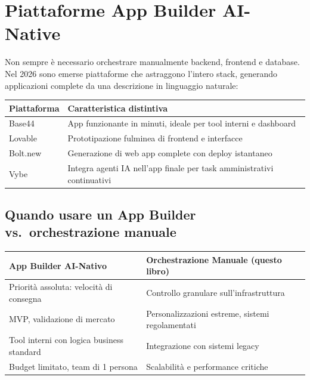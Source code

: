 \section{Piattaforme App Builder AI-Native}

Non sempre è necessario orchestrare manualmente backend, frontend e database. Nel 2026 sono emerse piattaforme che astraggono l'intero stack, generando applicazioni complete da una descrizione in linguaggio naturale:

\begin{center}
\begin{tabularx}{\textwidth}{l X}
\toprule
\textbf{Piattaforma} & \textbf{Caratteristica distintiva} \\
\midrule
Base44 & App funzionante in minuti, ideale per tool interni e dashboard \\
Lovable & Prototipazione fulminea di frontend e interfacce \\
Bolt.new & Generazione di web app complete con deploy istantaneo \\
Vybe & Integra agenti IA nell'app finale per task amministrativi continuativi \\
\bottomrule
\end{tabularx}
\end{center}

\subsection{Quando usare un App Builder vs.\ orchestrazione manuale}

\begin{center}
\begin{small}
\begin{tabularx}{\textwidth}{X X}
\toprule
\textbf{App Builder AI-Nativo} & \textbf{Orchestrazione Manuale (questo libro)} \\
\midrule
Priorità assoluta: velocità di consegna & Controllo granulare sull'infrastruttura \\
MVP, validazione di mercato & Personalizzazioni estreme, sistemi regolamentati \\
Tool interni con logica business standard & Integrazione con sistemi legacy \\
Budget limitato, team di 1 persona & Scalabilità e performance critiche \\
\bottomrule
\end{tabularx}
\end{small}
\end{center}

